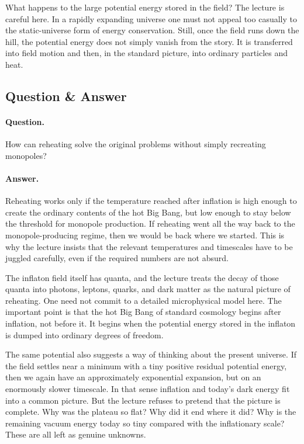 What happens to the large potential energy stored in the field? The lecture is careful here. In a rapidly expanding universe one must not appeal too casually to the static-universe form of energy conservation. Still, once the field runs down the hill, the potential energy does not simply vanish from the story. It is transferred into field motion and then, in the standard picture, into ordinary particles and heat.

\subsection{Question \& Answer}

\paragraph{Question.} How can reheating solve the original problems without simply recreating monopoles?

\paragraph{Answer.} Reheating works only if the temperature reached after inflation is high enough to create the ordinary contents of the hot Big Bang, but low enough to stay below the threshold for monopole production. If reheating went all the way back to the monopole-producing regime, then we would be back where we started. This is why the lecture insists that the relevant temperatures and timescales have to be juggled carefully, even if the required numbers are not absurd.

The inflaton field itself has quanta, and the lecture treats the decay of those quanta into photons, leptons, quarks, and dark matter as the natural picture of reheating. One need not commit to a detailed microphysical model here. The important point is that the hot Big Bang of standard cosmology begins after inflation, not before it. It begins when the potential energy stored in the inflaton is dumped into ordinary degrees of freedom.

The same potential also suggests a way of thinking about the present universe. If the field settles near a minimum with a tiny positive residual potential energy, then we again have an approximately exponential expansion, but on an enormously slower timescale. In that sense inflation and today's dark energy fit into a common picture. But the lecture refuses to pretend that the picture is complete. Why was the plateau so flat? Why did it end where it did? Why is the remaining vacuum energy today so tiny compared with the inflationary scale? These are all left as genuine unknowns.

